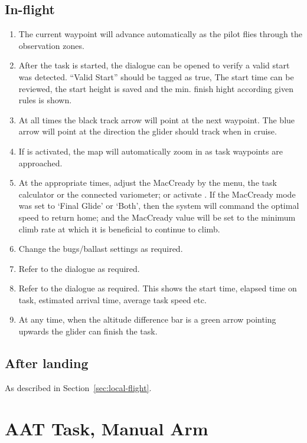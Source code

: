 \subsection*{In-flight}
\begin{enumerate}
\item  The current waypoint will advance automatically as the pilot flies
  through the observation zones.  
\item  After the task is started, the  dialogue can be opened to
  verify a valid start was detected.  ``Valid Start'' should be tagged as true,
  The start time can be reviewed, the start height is saved and the min. finish
  hight according given rules is shown.
\item  At all times the black track arrow will point at the next waypoint.  The
  blue arrow will point at the direction the glider should track when in cruise.
\item  If  is activated, the map will automatically zoom in as
  task waypoints are approached.
\item  At the appropriate times, adjust the MacCready by the menu,
  the task calculator or the connected variometer; or activate .
  If the MacCready mode was set to `Final Glide' or `Both', then the system will 
  command the optimal speed to return home; and the MacCready value will be set 
  to the minimum climb rate at which it is beneficial to continue to climb.
\item  Change the bugs/ballast settings as required.
\item  Refer to the  dialogue as required. 
\item  Refer to the  dialogue as required.  This shows the start
  time, elapsed time on task, estimated arrival time, average task speed etc.
\item  At any time, when the altitude difference bar is a green arrow pointing 
  upwards the glider can finish the task.

\end{enumerate}

\subsection*{After landing}
As described in Section~\ref{sec:local-flight}.


\section{AAT Task, Manual Arm}\label{sec:aat-task-manual}

